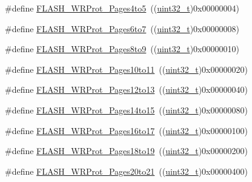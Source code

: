 \begin{DoxyCompactItemize}
\item 
\#define \hyperlink{group___option___bytes___write___protection_ga2835294ea5c096360cc5683b7f90b543}{F\+L\+A\+S\+H\+\_\+\+W\+R\+Prot\+\_\+\+Pages4to5}~((\hyperlink{_p_e___types_8h_a33594304e786b158f3fb30289278f5af}{uint32\+\_\+t})0x00000004)
\item 
\#define \hyperlink{group___option___bytes___write___protection_ga289b919ff7f6e7287facf108b8b94619}{F\+L\+A\+S\+H\+\_\+\+W\+R\+Prot\+\_\+\+Pages6to7}~((\hyperlink{_p_e___types_8h_a33594304e786b158f3fb30289278f5af}{uint32\+\_\+t})0x00000008)
\item 
\#define \hyperlink{group___option___bytes___write___protection_ga72f231c0fe953f3cd43cf421c2626f90}{F\+L\+A\+S\+H\+\_\+\+W\+R\+Prot\+\_\+\+Pages8to9}~((\hyperlink{_p_e___types_8h_a33594304e786b158f3fb30289278f5af}{uint32\+\_\+t})0x00000010)
\item 
\#define \hyperlink{group___option___bytes___write___protection_ga778d8038df46c0d25d9a24717a5c5dc9}{F\+L\+A\+S\+H\+\_\+\+W\+R\+Prot\+\_\+\+Pages10to11}~((\hyperlink{_p_e___types_8h_a33594304e786b158f3fb30289278f5af}{uint32\+\_\+t})0x00000020)
\item 
\#define \hyperlink{group___option___bytes___write___protection_ga571e248a64ef9bf7f99ed85831aacaaa}{F\+L\+A\+S\+H\+\_\+\+W\+R\+Prot\+\_\+\+Pages12to13}~((\hyperlink{_p_e___types_8h_a33594304e786b158f3fb30289278f5af}{uint32\+\_\+t})0x00000040)
\item 
\#define \hyperlink{group___option___bytes___write___protection_ga5e5fcead35c861e1329c3e4e7e3ffa4e}{F\+L\+A\+S\+H\+\_\+\+W\+R\+Prot\+\_\+\+Pages14to15}~((\hyperlink{_p_e___types_8h_a33594304e786b158f3fb30289278f5af}{uint32\+\_\+t})0x00000080)
\item 
\#define \hyperlink{group___option___bytes___write___protection_ga33deabc2c4a82cfa4a98008082e29ea7}{F\+L\+A\+S\+H\+\_\+\+W\+R\+Prot\+\_\+\+Pages16to17}~((\hyperlink{_p_e___types_8h_a33594304e786b158f3fb30289278f5af}{uint32\+\_\+t})0x00000100)
\item 
\#define \hyperlink{group___option___bytes___write___protection_ga856fdcf3d41edc73902fcf93a1e375d9}{F\+L\+A\+S\+H\+\_\+\+W\+R\+Prot\+\_\+\+Pages18to19}~((\hyperlink{_p_e___types_8h_a33594304e786b158f3fb30289278f5af}{uint32\+\_\+t})0x00000200)
\item 
\#define \hyperlink{group___option___bytes___write___protection_ga09215d5d245c8f5cd664c5cc4ff9fb69}{F\+L\+A\+S\+H\+\_\+\+W\+R\+Prot\+\_\+\+Pages20to21}~((\hyperlink{_p_e___types_8h_a33594304e786b158f3fb30289278f5af}{uint32\+\_\+t})0x00000400)

\end{DoxyCompactItemize}
